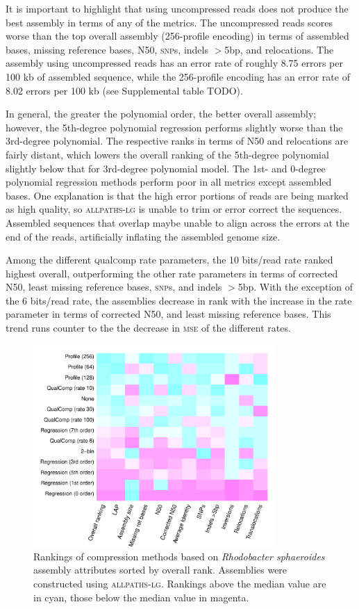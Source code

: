 \documentclass{bioinfo}
\begin{document}
It is important to highlight that using uncompressed reads does not
produce the best assembly in terms of any of the metrics. The
uncompressed reads scores worse than the top overall assembly
(256-profile encoding) in terms of assembled bases, missing reference
bases, N50, \textsc{snp}s, indels $>$5bp, and relocations. The
assembly using uncompressed reads has an error rate of roughly 8.75
errors per 100 kb of assembled sequence, while the 256-profile
encoding has an error rate of 8.02 errors per 100 kb (see Supplemental
table TODO).

In general, the greater the polynomial order, the better overall
assembly; however, the 5th-degree polynomial regression performs
slightly worse than the 3rd-degree polynomial. The respective ranks in
terms of N50 and relocations are fairly distant, which lowers the
overall ranking of the 5th-degree polynomial slightly below that for
3rd-degree polynomial model. The 1st- and 0-degree polynomial
regression methods perform poor in all metrics except assembled bases.
One explanation is that the high error portions of reads are being
marked as high quality, so \textsc{allpaths-lg} is unable to trim or
error correct the sequences. Assembled sequences that overlap maybe
unable to align across the errors at the end of the reads, artificially
inflating the assembled genome size.

Among the different \textsc{q}ual\textsc{c}omp rate parameters, the 10 bits/read rate
ranked highest overall, outperforming the other rate parameters in
terms of corrected N50, least missing reference bases, \textsc{snp}s,
and indels $>$5bp. With the exception of the 6 bits/read rate, the
assemblies decrease in rank with the increase in the rate parameter in
terms of corrected N50, and least missing reference bases. This trend
runs counter to the the decrease in \textsc{mse} of the different
rates.


\begin{figure}[!tbp]%
\centerline{\includegraphics[width=3.65in]{rhodo_assembly_results.pdf}}
\caption{Rankings of compression methods based on \textit{Rhodobacter
    sphaeroides} assembly attributes sorted by overall
  rank. Assemblies were constructed using \textsc{allpaths-lg}.
  Rankings above the median value are in cyan, those below the median
  value in magenta.}
  \label{fig:assembly_ranks}
\end{figure}
\end{document}
